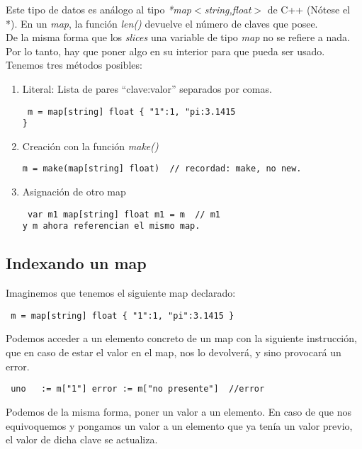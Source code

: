 Este tipo de datos es análogo al tipo \textit{*map$<$string,float$>$} de C++
(Nótese el *). En un \textit{map}, la función \textit{len()} devuelve el número
de claves que posee.\\

De la misma forma que los \textit{slices} una variable de tipo \textit{map} no
se refiere a nada. Por lo tanto, hay que poner algo en su interior para que
pueda ser usado. Tenemos tres métodos posibles:

\begin{enumerate} \item Literal: Lista de pares ``clave:valor'' separados por
comas.  \begin{verbatim} m = map[string] float { "1":1, "pi:3.1415
} \end{verbatim} \item Creación con la función \textit{make()} \begin{verbatim}
m = make(map[string] float)  // recordad: make, no new.  \end{verbatim} \item
Asignación de otro map \begin{verbatim} var m1 map[string] float m1 = m  // m1
y m ahora referencian el mismo map.  \end{verbatim} \end{enumerate}

	\subsection{Indexando un map}
	
	Imaginemos que tenemos el siguiente map declarado:
	
	\begin{verbatim} m = map[string] float { "1":1, "pi":3.1415 } \end{verbatim}
	
	Podemos acceder a un elemento concreto de un map con la siguiente
	instrucción, que en caso de estar el valor en el map, nos lo devolverá,
	y sino provocará un error.
	
	\begin{verbatim} uno   := m["1"] error := m["no presente"]  //error
	\end{verbatim}
	
	Podemos de la misma forma, poner un valor a un elemento. En caso de que nos
	equivoquemos y pongamos un valor a un elemento que ya tenía un valor previo,
	el valor de dicha clave se actualiza.
	
